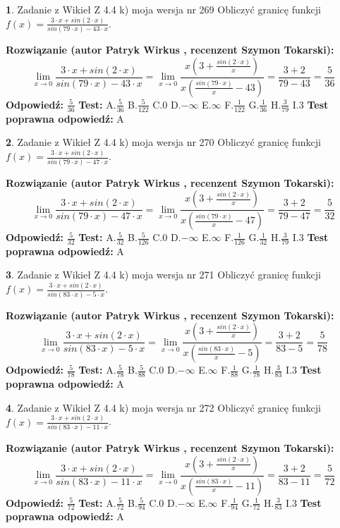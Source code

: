 \documentclass[12pt, a4paper]{article}
\theoremstyle{definition} %
\newtheorem{zad}{}
\newcommand{\zadStart}[1]{\begin{zad}#1\newline}
\newcommand{\zadStop}{\end{zad}}
\newcommand{\rozwStart}[2]{\noindent \textbf{Rozwiązanie (autor #1 , recenzent #2): }\newline}
\newcommand{\rozwStop}{\newline}
\newcommand{\odpStart}{\noindent \textbf{Odpowiedź:}\newline}
\newcommand{\odpStop}{\newline}
\newcommand{\testStart}{\noindent \textbf{Test:}\newline}
\newcommand{\testStop}{\newline}
\newcommand{\kluczStart}{\noindent \textbf{Test poprawna odpowiedź:}\newline}
\newcommand{\kluczStop}{\newline}
\begin{document}
\zadStart{Zadanie z Wikieł Z 4.4 k) moja wersja nr 269}
Obliczyć granicę funkcji $f(x)=\frac{3\cdot x +sin(2\cdot x)}{sin(79\cdot x) -43\cdot x}$.
\zadStop
\rozwStart{Patryk Wirkus}{Szymon Tokarski}
$$\lim\limits_{x\to 0}\frac{3\cdot x +sin(2\cdot x)}{sin(79\cdot x) -43\cdot x}
=\lim\limits_{x\to 0}\frac{x(3+\frac{sin(2\cdot x)}{x})}{x(\frac{sin(79\cdot x)}{x}-43)}
=\frac{3+2}{79-43} = \frac{5}{36}$$
\rozwStop
\odpStart
$\frac{5}{36}$
\odpStop
\testStart
A.$\frac{5}{36}$
B.$\frac{5}{122}$
C.$0$
D.$-\infty$
E.$\infty$
F.$\frac{1}{122}$
G.$\frac{1}{36}$
H.$\frac{3}{79}$
I.$3$
\testStop
\kluczStart
A
\kluczStop



\zadStart{Zadanie z Wikieł Z 4.4 k) moja wersja nr 270}
Obliczyć granicę funkcji $f(x)=\frac{3\cdot x +sin(2\cdot x)}{sin(79\cdot x) -47\cdot x}$.
\zadStop
\rozwStart{Patryk Wirkus}{Szymon Tokarski}
$$\lim\limits_{x\to 0}\frac{3\cdot x +sin(2\cdot x)}{sin(79\cdot x) -47\cdot x}
=\lim\limits_{x\to 0}\frac{x(3+\frac{sin(2\cdot x)}{x})}{x(\frac{sin(79\cdot x)}{x}-47)}
=\frac{3+2}{79-47} = \frac{5}{32}$$
\rozwStop
\odpStart
$\frac{5}{32}$
\odpStop
\testStart
A.$\frac{5}{32}$
B.$\frac{5}{126}$
C.$0$
D.$-\infty$
E.$\infty$
F.$\frac{1}{126}$
G.$\frac{1}{32}$
H.$\frac{3}{79}$
I.$3$
\testStop
\kluczStart
A
\kluczStop



\zadStart{Zadanie z Wikieł Z 4.4 k) moja wersja nr 271}
Obliczyć granicę funkcji $f(x)=\frac{3\cdot x +sin(2\cdot x)}{sin(83\cdot x) -5\cdot x}$.
\zadStop
\rozwStart{Patryk Wirkus}{Szymon Tokarski}
$$\lim\limits_{x\to 0}\frac{3\cdot x +sin(2\cdot x)}{sin(83\cdot x) -5\cdot x}
=\lim\limits_{x\to 0}\frac{x(3+\frac{sin(2\cdot x)}{x})}{x(\frac{sin(83\cdot x)}{x}-5)}
=\frac{3+2}{83-5} = \frac{5}{78}$$
\rozwStop
\odpStart
$\frac{5}{78}$
\odpStop
\testStart
A.$\frac{5}{78}$
B.$\frac{5}{88}$
C.$0$
D.$-\infty$
E.$\infty$
F.$\frac{1}{88}$
G.$\frac{1}{78}$
H.$\frac{3}{83}$
I.$3$
\testStop
\kluczStart
A
\kluczStop



\zadStart{Zadanie z Wikieł Z 4.4 k) moja wersja nr 272}
Obliczyć granicę funkcji $f(x)=\frac{3\cdot x +sin(2\cdot x)}{sin(83\cdot x) -11\cdot x}$.
\zadStop
\rozwStart{Patryk Wirkus}{Szymon Tokarski}
$$\lim\limits_{x\to 0}\frac{3\cdot x +sin(2\cdot x)}{sin(83\cdot x) -11\cdot x}
=\lim\limits_{x\to 0}\frac{x(3+\frac{sin(2\cdot x)}{x})}{x(\frac{sin(83\cdot x)}{x}-11)}
=\frac{3+2}{83-11} = \frac{5}{72}$$
\rozwStop
\odpStart
$\frac{5}{72}$
\odpStop
\testStart
A.$\frac{5}{72}$
B.$\frac{5}{94}$
C.$0$
D.$-\infty$
E.$\infty$
F.$\frac{1}{94}$
G.$\frac{1}{72}$
H.$\frac{3}{83}$
I.$3$
\testStop
\kluczStart
A
\kluczStop
\end{document}
